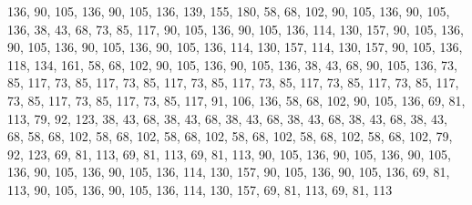 136, 90, 105, 136, 90, 105, 136, 139, 155, 180, 58, 68, 102, 90, 105, 136,
90, 105, 136, 38, 43, 68, 73, 85, 117, 90, 105, 136, 90, 105, 136, 114,
130, 157, 90, 105, 136, 90, 105, 136, 90, 105, 136, 90, 105, 136, 114, 130,
157, 114, 130, 157, 90, 105, 136, 118, 134, 161, 58, 68, 102, 90, 105, 136,
90, 105, 136, 38, 43, 68, 90, 105, 136, 73, 85, 117, 73, 85, 117, 73,
85, 117, 73, 85, 117, 73, 85, 117, 73, 85, 117, 73, 85, 117, 73, 85,
117, 73, 85, 117, 73, 85, 117, 91, 106, 136, 58, 68, 102, 90, 105, 136,
69, 81, 113, 79, 92, 123, 38, 43, 68, 38, 43, 68, 38, 43, 68, 38,
43, 68, 38, 43, 68, 38, 43, 68, 58, 68, 102, 58, 68, 102, 58, 68,
102, 58, 68, 102, 58, 68, 102, 58, 68, 102, 79, 92, 123, 69, 81, 113,
69, 81, 113, 69, 81, 113, 90, 105, 136, 90, 105, 136, 90, 105, 136, 90,
105, 136, 90, 105, 136, 114, 130, 157, 90, 105, 136, 90, 105, 136, 69, 81,
113, 90, 105, 136, 90, 105, 136, 114, 130, 157, 69, 81, 113, 69, 81, 113
